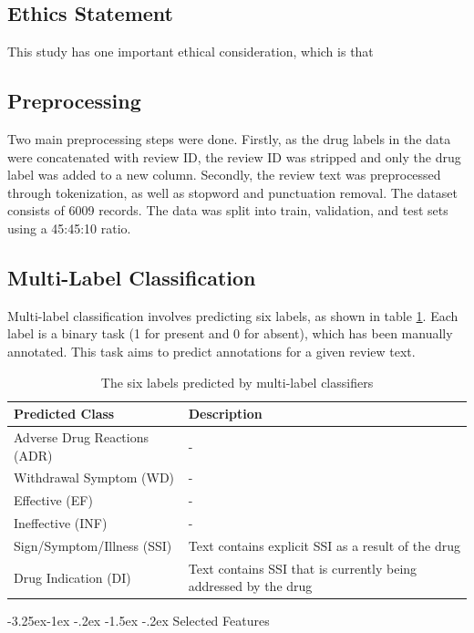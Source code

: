 \documentclass[10.7pt, onecolumn]{article}
\makeatletter
\renewcommand\subsubsection{\@startsection{subsubsection}{3}{\z@}%
	{-3.25ex\@plus -1ex \@minus -.2ex}%
    {-1.5ex \@plus -.2ex}%
    {\normalfont\itshape}}
\makeatother
\begin{document}
\subsection{Ethics Statement}

This study has one important ethical consideration, which is that 


\subsection{Preprocessing}
Two main preprocessing steps were done. Firstly, as the drug labels in the data were concatenated with review ID, the review ID was stripped and only the drug label was added to a new column. Secondly, the review text was preprocessed through tokenization, as well as stopword and punctuation removal. The dataset consists of 6009 records. The data was split into train, validation, and test sets using a 45:45:10 ratio.
\subsection{Multi-Label Classification}
Multi-label classification involves predicting six labels, as shown in table \ref{tab:6Labels}. Each label is a binary task (1 for present and 0 for absent), which has been manually annotated. This task aims to predict annotations for a given review text.

\begin{table}[H]
  \centering
  \begin{tabular}{|p{4cm}|p{3cm}|}
    \hline
    \textbf{Predicted Class} & \textbf{Description} \\
    \hline
    Adverse Drug Reactions (ADR) & - \\
    \hline
    Withdrawal Symptom (WD) & - \\
    \hline
    Effective (EF) & - \\
    \hline
    Ineffective (INF) & - \\
    \hline
    Sign/Symptom/Illness (SSI) & Text contains explicit SSI as a result of the drug \\
    \hline
    Drug Indication (DI) & Text contains SSI that is currently being addressed by the drug \\
    \hline
  \end{tabular}
  \caption{The six labels predicted by multi-label classifiers}
  \label{tab:6Labels}
\end{table}

\subsubsection{Selected Features}
\end{document}
